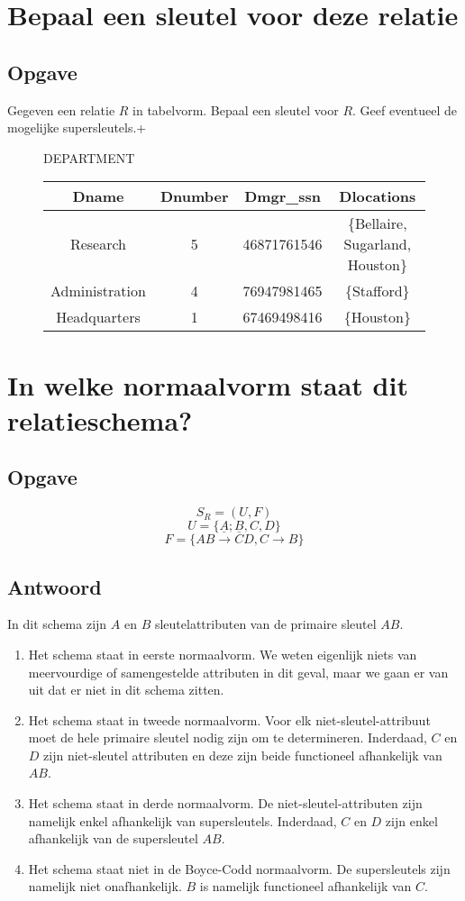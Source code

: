 \documentclass[normaalvormen.tex]{subfiles}
\begin{document}
\section{Bepaal een sleutel voor deze relatie}
\subsection*{Opgave}
Gegeven een relatie $R$ in tabelvorm. Bepaal een sleutel voor $R$.
Geef eventueel de mogelijke supersleutels.+
\begin{figure}[H]
\centering
DEPARTMENT\\
\begin{tabular}{c|c|c|c}
Dname & Dnumber & Dmgr\_ssn & Dlocations\\\hline
Research &5 & 46871761546 & \{Bellaire, Sugarland, Houston\}\\
Administration & 4& 76947981465 & \{Stafford\}\\
Headquarters & 1 & 67469498416 & \{Houston\}
\end{tabular}
\end{figure}

\section{In welke normaalvorm staat dit relatieschema?}
\subsection*{Opgave}
\[
S_{R} = (U,F)
\]
\[
U = \{\underline{A};\underline{B},C,D\}
\]
\[
F = \{AB\rightarrow CD, C \rightarrow B\}
\]

\subsection*{Antwoord}
In dit schema zijn $A$ en $B$ sleutelattributen van de primaire sleutel $AB$.
\begin{enumerate}
\item Het schema staat in eerste normaalvorm. We weten eigenlijk niets van meervourdige of samengestelde attributen in dit geval, maar we gaan er van uit dat er niet in dit schema zitten.

\item Het schema staat in tweede normaalvorm. Voor elk niet-sleutel-attribuut moet de hele primaire sleutel nodig zijn om te determineren. Inderdaad, $C$ en $D$ zijn niet-sleutel attributen en deze zijn beide functioneel afhankelijk van $AB$.

\item Het schema staat in derde normaalvorm. De niet-sleutel-attributen zijn namelijk enkel afhankelijk van supersleutels. Inderdaad, $C$ en $D$ zijn enkel afhankelijk van de supersleutel $AB$.

\item Het schema staat niet in de Boyce-Codd normaalvorm. De supersleutels zijn namelijk niet onafhankelijk. $B$ is namelijk functioneel afhankelijk van $C$.
\end{enumerate}
\end{document}
